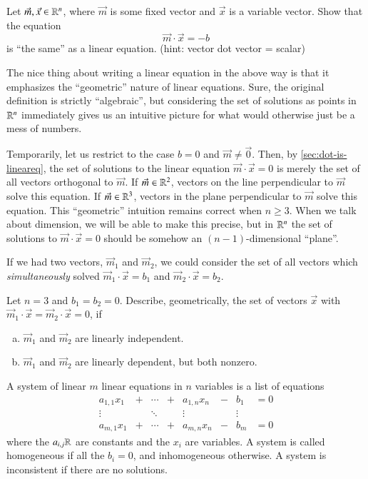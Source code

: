 \begin{EasyEx}
  \label{sec:dot-is-lineareq}
  Let $\vec{m},\vec{x}\in\mathbb{R}^n$, where $\vec{m}$ is some fixed vector and $\vec{x}$ is a variable vector. 
  Show that the equation
  \[\vec{m}\cdot\vec{x} = -b\]
  is ``the same'' as a linear equation.  (hint: vector dot vector = scalar)
\end{EasyEx}

\begin{Remark}
  The nice thing about writing a linear equation in the above way is that it emphasizes the ``geometric'' nature of linear equations.
  Sure, the original definition is strictly ``algebraic'', but considering the set of solutions as points in $\mathbb{R}^n$ immediately gives us an intuitive picture for what would otherwise just be a mess of numbers.  

  Temporarily, let us restrict to the case $b=0$ and $\vec{m}\ne \vec{0}$.  
  Then, by \ref{sec:dot-is-lineareq}, the set of solutions to the linear equation $\vec{m}\cdot\vec{x}=0$ is merely the set of all vectors orthogonal to $\vec{m}$.  
  If $\vec{m}\in\mathbb{R}^2$, vectors on the line perpendicular to $\vec{m}$ solve this equation.  
  If $\vec{m}\in\mathbb{R}^3$, vectors in the plane perpendicular to $\vec{m}$ solve this equation.
  This ``geometric'' intuition remains correct when $n\ge 3$.  
  When we talk about dimension, we will be able to make this precise, but in $\mathbb{R}^n$ the set of solutions to $\vec{m}\cdot\vec{x}=0$ should be somehow an $(n-1)$-dimensional ``plane''.  
\end{Remark}

If we had two vectors, $\vec{m}_1$ and $\vec{m}_2$, we could consider the set of all vectors which \emph{simultaneously} solved $\vec{m}_1\cdot\vec{x}=b_1$ and $\vec{m}_2\cdot\vec{x}=b_2$.  
\begin{Ex}
  Let $n=3$ and $b_1=b_2=0$.  Describe, geometrically, the set of vectors $\vec{x}$ with $\vec{m}_1\cdot\vec{x}=\vec{m}_2\cdot\vec{x}=0$, if  
  \begin{enumerate}[a)]
  \item $\vec{m}_1$ and $\vec{m}_2$ are linearly independent.
  \item $\vec{m}_1$ and $\vec{m}_2$ are linearly dependent, but both nonzero.  
  \end{enumerate}
\end{Ex}

\begin{Def}
  A system of linear $m$ linear equations in $n$ variables is a list of equations
  \[\begin{array}{ccccccccc}
    a_{1,1}x_1 & + & \cdots & + & a_{1,n}x_n & - & b_1 & = 0\\
    \vdots     &   & \ddots &   & \vdots     &   & \vdots\\
    a_{m,1}x_1 & + & \cdots & + & a_{m,n}x_n & - & b_m & = 0
  \end{array}\]
  where the $a_{i,j}\mathbb{R}$ are constants and the $x_i$ are variables.
  A system is called homogeneous if all the $b_i=0$, and inhomogeneous otherwise.  
  A system is inconsistent if there are no solutions.  
\end{Def}

